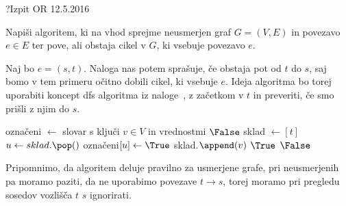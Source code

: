 \begin{naloga}{?}{Izpit OR 12.5.2016}
\begin{vprasanje}
Napiši algoritem,
ki na vhod sprejme neusmerjen graf $G = (V, E)$ in povezavo $e \in E$
ter pove, ali obstaja cikel v $G$, ki vsebuje povezavo $e$.
\end{vprasanje}

\begin{odgovor}
Naj bo $e = (s, t)$. 
Naloga nas potem sprašuje, če obstaja pot od $t$ do $s$, 
saj bomo v tem primeru očitno dobili cikel, ki vsebuje $e$.
Ideja algoritma bo torej uporabiti koncept {\sc dfs} algoritma iz naloge~\nal[Dfs], z začetkom v $t$ 
in preveriti, če smo prišli z njim do $s$.

\begin{small}
\begin{algorithmic}
	\State označeni $\gets$ slovar s ključi $v \in V$ in vrednostmi $\False$
	\State sklad $\gets [t]$
		\State $u \gets sklad.\pop()$
			\State označeni$[u] \gets \True$
					\State sklad.$\append(v)$
						\State \Return $\True$
					\EndIf
				\EndIf
			\EndFor
		\EndIf
	\EndWhile
	\State \Return $\False$
\EndFunction
\end{algorithmic}
\end{small}
Pripomnimo, da algoritem deluje pravilno za usmerjene grafe, 
pri neusmerjenih pa moramo paziti, 
da ne uporabimo povezave $t \rightarrow s$, 
torej moramo pri pregledu sosedov vozlišča $t$ $s$ ignorirati.
\end{odgovor}
\end{naloga}
